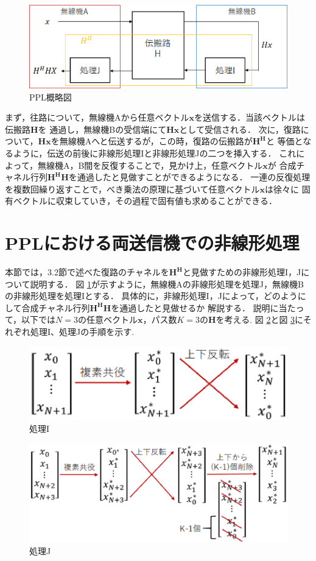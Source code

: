 \begin{figure}[t]
    \centering
    \includegraphics[width=\linewidth]{chapter3/figure/PPL.eps}
    \caption{PPL概略図}
    \label{figPPL}
\end{figure}

まず，往路について，無線機Aから任意ベクトル$\bm{x}$を送信する．当該ベクトルは伝搬路$\bm{H}$を
通過し，無線機Bの受信端にて$\bm{Hx}$として受信される．
次に，復路について，$\bm{Hx}$を無線機Aへと伝送するが，この時，復路の伝搬路が$\bm{H^H}$と
等価となるように，伝送の前後に非線形処理Iと非線形処理Jの二つを挿入する．
これによって，無線機A，B間を反復することで，見かけ上，任意ベクトル$\bm{x}$が
合成チャネル行列$\bm{H^HH}$を通過したと見做すことができるようになる．
一連の反復処理を複数回繰り返すことで，べき乗法の原理に基づいて任意ベクトル$\bm{x}$は徐々に
固有ベクトルに収束していき，その過程で固有値も求めることができる．

\section{PPLにおける両送信機での非線形処理}
本節では，3.2節で述べた復路のチャネルを$\bm{H^H}$と見做すための非線形処理I，Jについて説明する．
図 \ref{figPPL}が示すように，無線機Aの非線形処理を処理J，無線機Bの非線形処理を処理Iとする．
具体的に，非線形処理I，Jによって，どのようにして合成チャネル行列$\bm{H^HH}$を通過したと見做せるか
解説する．
説明に当たって，以下では$N=3$の任意ベクトル$\bm{x}$，パス数$K=3$の$\bm{H}$を考える.
図 \ref{figProcI}と図 \ref{figProcJ}にそれぞれ処理I、処理Jの手順を示す.

\begin{figure}[t]
    \centering
    \includegraphics[width=0.6\linewidth]{chapter3/figure/ProcI.eps}
    \caption{処理I}
    \label{figProcI}
\end{figure}
\begin{figure}[t]
    \centering
    \includegraphics[width=0.7\linewidth]{chapter3/figure/ProcJ.eps}
    \caption{処理J}
    \label{figProcJ}
\end{figure}

